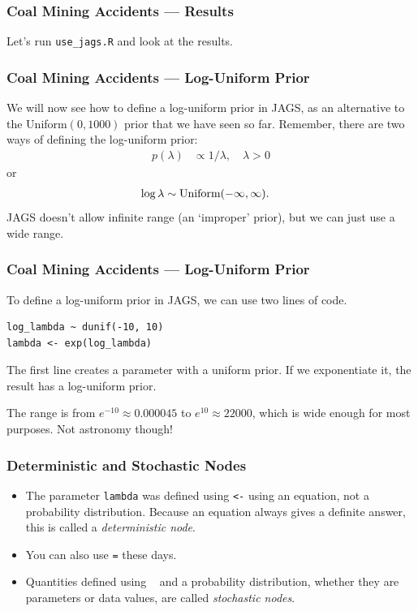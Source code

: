 \documentclass{beamer}
\begin{document}
\begin{frame}[fragile]
\frametitle{Coal Mining Accidents --- Results}
Let's run \texttt{use\_jags.R} and look at the results.

\end{frame}



\begin{frame}
\frametitle{Coal Mining Accidents --- Log-Uniform Prior}
We will now see how to define a log-uniform prior in JAGS,
as an alternative to the Uniform$(0, 1000)$ prior that we have
seen so far. Remember, there are two ways of defining the
log-uniform prior:\pause
\begin{align}
p(\lambda) &\propto 1/\lambda, \quad \lambda > 0
\end{align}
\pause
or
\begin{align}
\log \lambda &\sim \textnormal{Uniform}(-\infty, \infty).
\end{align}
\pause
JAGS doesn't allow infinite range (an `improper' prior),
but we can just use a wide range.

\end{frame}


\begin{frame}[fragile]
\frametitle{Coal Mining Accidents --- Log-Uniform Prior}
To define a log-uniform prior in JAGS, we can use two lines of code.
\begin{verbatim}
log_lambda ~ dunif(-10, 10)
lambda <- exp(log_lambda)
\end{verbatim}
\pause

The first line creates a parameter with a uniform prior. If
we exponentiate it, the result has a log-uniform prior.\pause

The range is from $e^{-10} \approx 0.000045$ to $e^{10} \approx 22000$,
which is wide enough for most purposes. Not astronomy though!
\end{frame}


\begin{frame}[fragile]
\frametitle{Deterministic and Stochastic Nodes}
\begin{itemize}
\item The parameter \texttt{lambda} was defined using \texttt{<-}
using an equation, not a probability distribution. Because an equation always
gives a definite answer, this is called a {\em deterministic node}. \pause
\item You can also use \texttt{=} these days.\pause
\item Quantities defined using \texttt{~} and a probability distribution,
whether they are parameters or data values, are called
{\em stochastic nodes}.
\end{itemize}
\end{frame}
\end{document}
